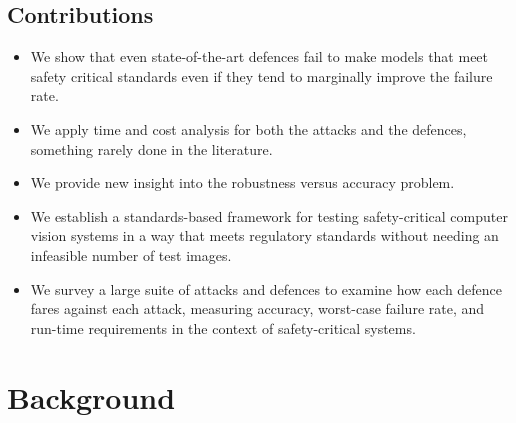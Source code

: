 \subsection{Contributions}
\begin{itemize}
    \item We show that even state-of-the-art defences fail to make models that meet safety critical standards even if they tend to marginally improve the failure rate.
    \item We apply time and cost analysis for both the attacks and the defences, something rarely done in the literature.
    \item We provide new insight into the robustness versus accuracy problem.
    \item We establish a standards-based framework for testing safety-critical computer vision systems in a way that meets regulatory standards without needing an infeasible number of test images.
    \item We survey a large suite of attacks and defences to examine how each defence fares against each attack, measuring accuracy, worst-case failure rate, and run-time requirements in the context of safety-critical systems.
\end{itemize}


\section{Background}

